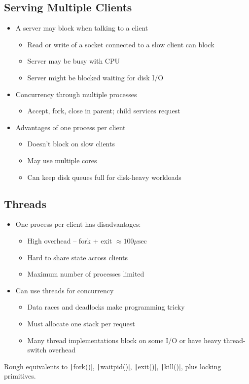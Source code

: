 {\subsection{Serving Multiple Clients}
\begin{itemize}[nosep]
    \item A server may block when talking to a client
          \begin{itemize}[nosep]
              \item Read or write of a socket connected to a slow client can block
              \item Server may be busy with CPU
              \item Server might be blocked waiting for disk I/O
          \end{itemize}
    \item Concurrency through multiple processes
          \begin{itemize}[nosep]
              \item Accept, fork, close in parent; child services request
          \end{itemize}
    \item Advantages of one process per client
          \begin{itemize}[nosep]
              \item Doesn't block on slow clients
              \item May use multiple cores
              \item Can keep disk queues full for disk-heavy workloads
          \end{itemize}
\end{itemize}
\subsection{Threads}
\begin{itemize}[nosep]
    \item One process per client has disadvantages:
          \begin{itemize}[nosep]
              \item High overhead -- fork + exit $\approx100\mu\text{sec}$
              \item Hard to share state across clients
              \item Maximum number of processes limited
          \end{itemize}
    \item Can use threads for concurrency
          \begin{itemize}[nosep]
              \item Data races and deadlocks make programming tricky
              \item Must allocate one stack per request
              \item Many thread implementations block on some I/O or have heavy thread-switch overhead
          \end{itemize}
\end{itemize}
Rough equivalents to \texttt|fork()|, \texttt|waitpid()|, \texttt|exit()|, \texttt|kill()|, plus locking primitives.

}
